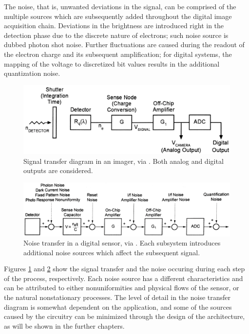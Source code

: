 
The noise, that is, unwanted deviations in the signal, can be comprised of the multiple sources which are subsequently added throughout the digital image acquisition chain. Deviations in the brightness are introduced right in the detection phase due to the discrete nature of electrons; such noise source is dubbed photon shot noise. Further fluctuations are caused during the readout of the electron charge and its subsequent amplification; for digital systems, the mapping of the voltage to discretized bit values results in the additional quantization noise. \cite{Holst2011}

\begin{figure}[h]
  \centering
  \includegraphics[width=\linewidth]{imgs/sensors/sens-signal-transfer.png}
  \caption{Signal transfer diagram in an imager, via \cite{Holst2011}. Both analog and digital outputs are considered.}
  \label{fig:sigtrans}
\end{figure}

\begin{figure}[h]
  \centering
  \includegraphics[width=\linewidth]{imgs/sensors/sens-noise-transfer.png}
  \caption{Noise transfer in a digital sensor, via \cite{Holst2011}. Each subsystem introduces additional noise sources which affect the subsequent signal.}
  \label{fig:noisetrans}
\end{figure}

Figures \ref{fig:sigtrans} and \ref{fig:noisetrans} show the signal transfer and the noise occuring during each step of the process, respectively. Each noise source has a different characteristics and can be attributed to either nonuniformities and physical flows of the sensor, or the natural nonstationary processes. The level of detail in the noise transfer diagram is somewhat dependent on the application, and some of the sources caused by the circuitry can be minimized through the design of the architecture, as will be shown in the further chapters. 